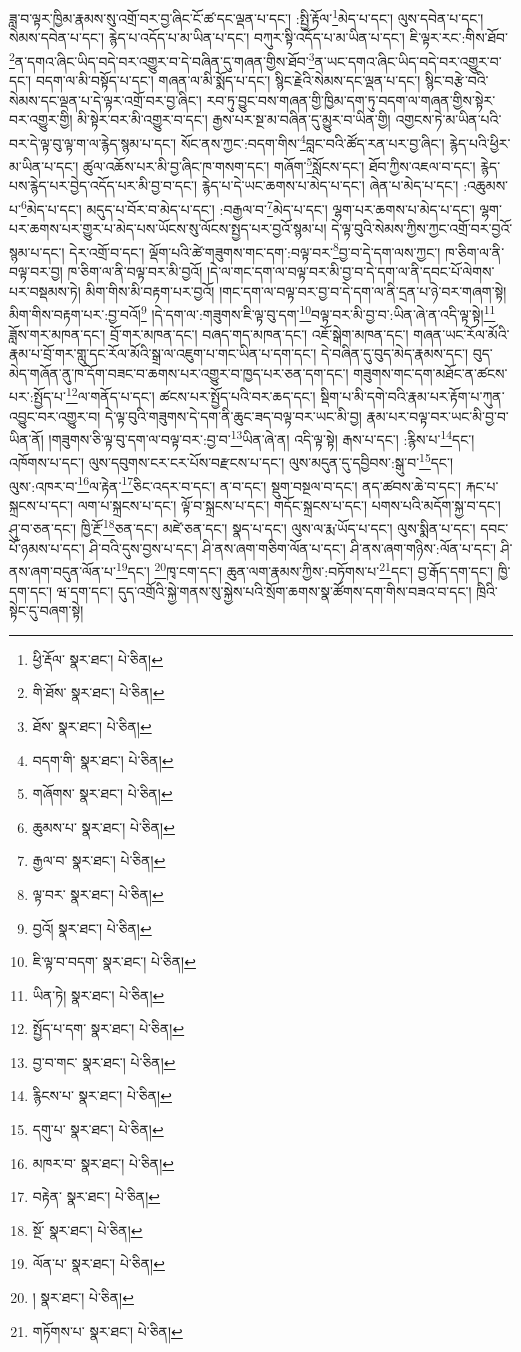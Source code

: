 ཟླ་བ་ལྟར་ཁྱིམ་རྣམས་སུ་འགྲོ་བར་བྱ་ཞིང་ངོ་ཚ་དང་ལྡན་པ་དང་། :སྤྱི་རྟོལ་\footnote{ཕྱི་རྡོལ་  སྣར་ཐང་།  པེ་ཅིན། }མེད་པ་དང་། ལུས་དབེན་པ་དང་། སེམས་དབེན་པ་དང་། རྙེད་པ་འདོད་པ་མ་ཡིན་པ་དང་། བཀུར་སྟི་འདོད་པ་མ་ཡིན་པ་དང་། ཇི་ལྟར་རང་:གིས་ཐོབ་\footnote{གི་ཐོས་  སྣར་ཐང་།  པེ་ཅིན། }ན་དགའ་ཞིང་ཡིད་བདེ་བར་འགྱུར་བ་དེ་བཞིན་དུ་གཞན་གྱིས་ཐོབ་\footnote{ཐོས་  སྣར་ཐང་།  པེ་ཅིན། }ན་ཡང་དགའ་ཞིང་ཡིད་བདེ་བར་འགྱུར་བ་དང་། བདག་ལ་མི་བསྟོད་པ་དང་། གཞན་ལ་མི་སྨོད་པ་དང་། སྙིང་རྗེའི་སེམས་དང་ལྡན་པ་དང་། སྙིང་བརྩེ་བའི་སེམས་དང་ལྡན་པ་དེ་ལྟར་འགྲོ་བར་བྱ་ཞིང་། རབ་ཏུ་བྱུང་བས་གཞན་གྱི་ཁྱིམ་དག་ཏུ་བདག་ལ་གཞན་གྱིས་སྟེར་བར་འགྱུར་གྱི། མི་སྟེར་བར་མི་འགྱུར་བ་དང་། རྒྱས་པར་སྔ་མ་བཞིན་དུ་མྱུར་བ་ཡིན་གྱི། འགྱངས་ཏེ་མ་ཡིན་པའི་བར་དེ་ལྟ་བུ་ལྟ་ག་ལ་རྙེད་སྙམ་པ་དང་། སོང་ནས་ཀྱང་:བདག་གིས་\footnote{བདག་གི་  སྣར་ཐང་།  པེ་ཅིན། }བླང་བའི་ཚོད་རན་པར་བྱ་ཞིང་། རྙེད་པའི་ཕྱིར་མ་ཡིན་པ་དང་། ཚུལ་འཆོས་པར་མི་བྱ་ཞིང་ཁ་གསག་དང་། གཞོག་\footnote{གཞོགས་  སྣར་ཐང་།  པེ་ཅིན། }སློངས་དང་། ཐོབ་ཀྱིས་འཇལ་བ་དང་། རྙེད་པས་རྙེད་པར་བྱེད་འདོད་པར་མི་བྱ་བ་དང་། རྙེད་པ་དེ་ཡང་ཆགས་པ་མེད་པ་དང་། ཞེན་པ་མེད་པ་དང་། :འཆུམས་པ་\footnote{ཆུམས་པ་  སྣར་ཐང་།  པེ་ཅིན། }མེད་པ་དང་། མདུད་པ་བོར་བ་མེད་པ་དང་། :བརྒྱལ་བ་\footnote{རྒྱལ་བ་  སྣར་ཐང་།  པེ་ཅིན། }མེད་པ་དང་། ལྷག་པར་ཆགས་པ་མེད་པ་དང་། ལྷག་པར་ཆགས་པར་གྱུར་པ་མེད་པས་ཡོངས་སུ་ལོངས་སྤྱད་པར་བྱའོ་སྙམ་པ། དེ་ལྟ་བུའི་སེམས་ཀྱིས་ཀྱང་འགྲོ་བར་བྱའོ་སྙམ་པ་དང་། དེར་འགྲོ་བ་དང་། ལྡོག་པའི་ཚེ་གཟུགས་གང་དག་:བལྟ་བར་\footnote{ལྟ་བར་  སྣར་ཐང་།  པེ་ཅིན། }བྱ་བ་དེ་དག་ལས་ཀྱང་། ཁ་ཅིག་ལ་ནི་བལྟ་བར་བྱ། ཁ་ཅིག་ལ་ནི་བལྟ་བར་མི་བྱའོ། །དེ་ལ་གང་དག་ལ་བལྟ་བར་མི་བྱ་བ་དེ་དག་ལ་ནི་དབང་པོ་ལེགས་པར་བསྡམས་ཏེ། མིག་གིས་མི་བརྟག་པར་བྱའོ། །གང་དག་ལ་བལྟ་བར་བྱ་བ་དེ་དག་ལ་ནི་དྲན་པ་ཉེ་བར་གཞག་སྟེ། མིག་གིས་བརྟག་པར་:བྱ་བའོ།\footnote{བྱའོ།  སྣར་ཐང་།  པེ་ཅིན། } །དེ་དག་ལ་:གཟུགས་ཇི་ལྟ་བུ་དག་\footnote{ཇི་ལྟ་བ་བདག་  སྣར་ཐང་།  པེ་ཅིན། }བལྟ་བར་མི་བྱ་བ་:ཡིན་ཞེ་ན་འདི་ལྟ་སྟེ།\footnote{ཡིན་ཏེ།  སྣར་ཐང་།  པེ་ཅིན། } ཟློས་གར་མཁན་དང་། བྲོ་གར་མཁན་དང་། བཞད་གད་མཁན་དང་། འཇོ་སྒེག་མཁན་དང་། གཞན་ཡང་རོལ་མོའི་རྣམ་པ་བྲོ་གར་གླུ་དང་རོལ་མོའི་སྒྲ་ལ་འཇུག་པ་གང་ཡིན་པ་དག་དང་། དེ་བཞིན་དུ་བུད་མེད་རྣམས་དང་། བུད་མེད་གཞོན་ནུ་ཁ་དོག་བཟང་བ་ཆགས་པར་འགྱུར་བ་ཁྱད་པར་ཅན་དག་དང་། གཟུགས་གང་དག་མཐོང་ན་ཚངས་པར་:སྤྱོད་པ་\footnote{སྤྱོད་པ་དག་  སྣར་ཐང་།  པེ་ཅིན། }ལ་གནོད་པ་དང་། ཚངས་པར་སྤྱོད་པའི་བར་ཆད་དང་། སྡིག་པ་མི་དགེ་བའི་རྣམ་པར་རྟོག་པ་ཀུན་འབྱུང་བར་འགྱུར་བ། དེ་ལྟ་བུའི་གཟུགས་དེ་དག་ནི་ཆུང་ཟད་བལྟ་བར་ཡང་མི་བྱ། རྣམ་པར་བལྟ་བར་ཡང་མི་བྱ་བ་ཡིན་ནོ། །གཟུགས་ཅི་ལྟ་བུ་དག་ལ་བལྟ་བར་:བྱ་བ་\footnote{བྱ་བ་གང་  སྣར་ཐང་།  པེ་ཅིན། }ཡིན་ཞེ་ན། འདི་ལྟ་སྟེ། རྒས་པ་དང་། :རྙིས་པ་\footnote{རྙིངས་པ་  སྣར་ཐང་།  པེ་ཅིན། }དང་། འཁོགས་པ་དང་། ལུས་དབུགས་ངར་ངར་པོས་བརྫངས་པ་དང་། ལུས་མདུན་དུ་དབྱིབས་:སྒུ་བ་\footnote{དགུ་པ་  སྣར་ཐང་།  པེ་ཅིན། }དང་། ལུས་:འཁར་བ་\footnote{མཁར་བ་  སྣར་ཐང་།  པེ་ཅིན། }ལ་རྟེན་\footnote{བརྟེན་  སྣར་ཐང་།  པེ་ཅིན། }ཅིང་འདར་བ་དང་། ན་བ་དང་། སྡུག་བསྔལ་བ་དང་། ནད་ཚབས་ཆེ་བ་དང་། རྐང་པ་སྐྲངས་པ་དང་། ལག་པ་སྐྲངས་པ་དང་། ལྟོ་བ་སྐྲངས་པ་དང་། གདོང་སྐྲངས་པ་དང་། པགས་པའི་མདོག་སྐྱ་བ་དང་། ཤུ་བ་ཅན་དང་། ཁྱི་རྔོ་\footnote{སྔོ་  སྣར་ཐང་།  པེ་ཅིན། }ཅན་དང་། མཛེ་ཅན་དང་། སྣད་པ་དང་། ལུས་ལ་རྨ་ཡོད་པ་དང་། ལུས་སྨིན་པ་དང་། དབང་པོ་ཉམས་པ་དང་། ཤི་བའི་དུས་བྱས་པ་དང་། ཤི་ནས་ཞག་གཅིག་ལོན་པ་དང་། ཤི་ནས་ཞག་གཉིས་:ལོན་པ་དང་། ཤི་ནས་ཞག་བདུན་ལོན་པ་\footnote{ལོན་པ་  སྣར་ཐང་།  པེ་ཅིན། }དང་། \footnote{།    སྣར་ཐང་།  པེ་ཅིན། }ཁྭ་ངག་དང་། ཆུན་ལག་རྣམས་ཀྱིས་:བཏོགས་པ་\footnote{གཏོགས་པ་  སྣར་ཐང་།  པེ་ཅིན། }དང་། བྱ་རྒོད་དག་དང་། ཁྱི་དག་དང་། ཝ་དག་དང་། དུད་འགྲོའི་སྐྱེ་གནས་སུ་སྐྱེས་པའི་སྲོག་ཆགས་སྣ་ཚོགས་དག་གིས་བཟའ་བ་དང་། ཁྲིའི་སྟེང་དུ་བཞག་སྟེ། 